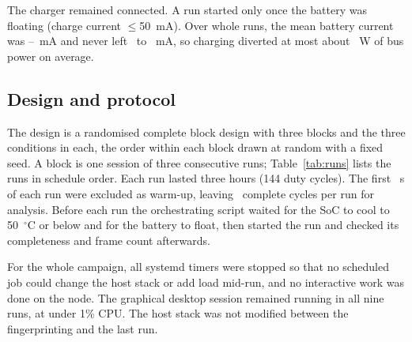 \documentclass[10pt,journal,compsoc]{IEEEtran}
\begin{document}
The charger remained connected. A run started only once the battery was floating (charge current $\le$50~mA). Over whole runs, the mean battery current was \BatIMeanMin--\BatIMeanMax~mA and never left \BatIMin\ to \BatIMax~mA, so charging diverted at most about \BatWMax~W of bus power on average.

\subsection{Design and protocol}
The design is a randomised complete block design with three blocks and the three conditions in each, the order within each block drawn at random with a fixed seed. A block is one session of three consecutive runs; Table~\ref{tab:runs} lists the runs in schedule order. Each run lasted three hours (144 duty cycles). The first \WarmupS~s of each run were excluded as warm-up, leaving \CyclesAnalysed\ complete cycles per run for analysis. Before each run the orchestrating script waited for the SoC to cool to 50~$^\circ$C or below and for the battery to float, then started the run and checked its completeness and frame count afterwards.

For the whole campaign, all systemd timers were stopped so that no scheduled job could change the host stack or add load mid-run, and no interactive work was done on the node. The graphical desktop session remained running in all nine runs, at under 1\% CPU. The host stack was not modified between the fingerprinting and the last run.


\end{document}
